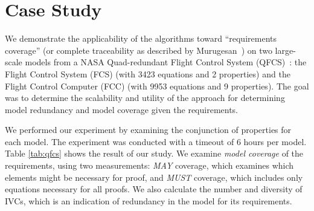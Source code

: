 \section{Case Study}

\label{sec:qfc}
We demonstrate the applicability of the algorithms toward ``requirements coverage'' (or complete traceability as described by Murugesan~\cite{Murugesan16:renext}) on two large-scale models from a NASA Quad-redundant Flight Control System (QFCS)~\cite{NFM2015:backes}: the Flight Control System (FCS) (with 3423 equations and 2 properties) and the Flight Control Computer (FCC) (with 9953 equations and 9 properties).  The goal was to determine the scalability and utility of the approach for determining model redundancy and model coverage given the requirements. 

We performed our experiment by examining the conjunction of properties for each model.  The experiment was conducted with a timeout of 6 hours per model. Table \ref{tab:qfcs} shows the result of our study.  We examine {\em model coverage} of the requirements, using two measurements: {\em MAY} coverage, which examines which elements might be necessary for proof, and {\em MUST} coverage, which includes only equations necessary for all proofs.  We also calculate the number and diversity of IVCs, which is an indication of redundancy in the model for its requirements.


\iffalse
For each model. when the \aivcalg\ did not terminate before 4 hours, its runtime is shown with incomplete. \ela{we can explain a bit the numbers and table here, then get to coverage}

As mentioned in Section~\ref{sec:intro}, proof-based coverage analysis is one important application of all minimal IVCs. The goal of a
coverage metric is usually to assign a numeric score that de-
scribes how well properties cover the design. The majority of
the work on coverage metrics has focused on mutations, which
are “atomic” changes to the design, where the set of possible
mutations depends on the notation that is used. For large models, mutation-based coverage is quite inefficient. Having all minimal IVCs, we can easily formalize a family of proof-based metrics. For example, owe could define two distinct coverage metrics as follows:
\ela{choose two metric that I can calculate: we could choose must and may since you also talk about them in the introduction}
\fi

